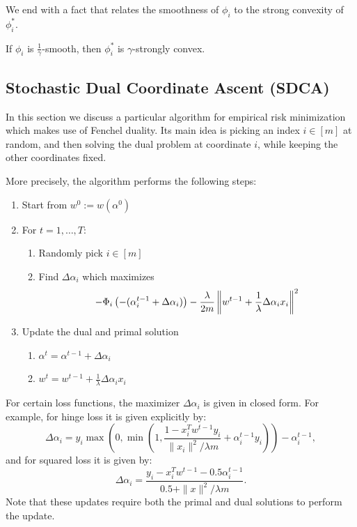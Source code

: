 We end with a fact that relates the smoothness of $\phi_i$ to the strong convexity of $\phi_i^*$.

\begin{fact}
If $\phi_i$ is $\frac{1}{\gamma}$-smooth, then $\phi^*_i$ is $\gamma$-strongly convex.
\end{fact}

\subsection{Stochastic Dual Coordinate Ascent (SDCA)}

In this section we discuss a particular algorithm for empirical risk minimization which makes use of Fenchel duality. Its main idea is picking an index $i\in[m]$ at random, and then solving the dual problem at coordinate $i$, while keeping the other coordinates fixed.

More precisely, the algorithm performs the following steps:
\begin{enumerate}
\item Start from $w^0:=w(\alpha^0)$
\item For $t=1,\dots, T$:
    \begin{enumerate}
        \item Randomly pick $i\in[m]$
        \item Find $\Delta\alpha_i$ which maximizes
        $$-\Phi_i\left(-(\alpha_i^{t-1}+\Delta\alpha_i)\right)-\frac{\lambda}{2m}\left\lVert w^{t-1}+\frac{1}{\lambda}\Delta\alpha_ix_i\right\rVert^2$$
    \end{enumerate}
\item Update the dual and primal solution
    \begin{enumerate}
        \item $\alpha^t = \alpha^{t-1}+\Delta\alpha_i$
        \item $w^t = w^{t-1} + \frac{1}{\lambda} \Delta\alpha_ix_i$
    \end{enumerate}
\end{enumerate}
For certain loss functions, the maximizer $\Delta\alpha_i$ is given in closed form. For example, for hinge loss it is given explicitly by:
$$\Delta\alpha_i = y_i\max\left(0,\min(1,\frac{1-x_i^Tw^{t-1}y_i}{\|x_i\|^2/\lambda m} + \alpha_i^{t-1}y_i)\right) - \alpha_i^{t-1},$$
and for squared loss it is given by:
$$\Delta\alpha_i = \frac{y_i - x_i^Tw^{t-1} - 0.5\alpha_i^{t-1}}{0.5 + \|x\|^2/\lambda m}.$$
Note that these updates require both the primal and dual solutions to perform the update.


